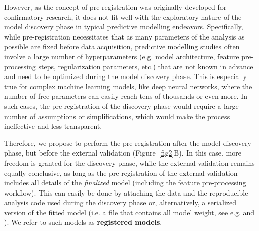 \documentclass{article}
\begin{document}
However, as the concept of pre-registration was originally developed for confirmatory research, it does not fit well with the exploratory nature of the model discovery phase in typical predictive modelling endeavors. Specifically, while pre-registration necessitates that as many parameters of the analysis as possible are fixed before data acquisition, predictive modelling studies often involve a large number of hyperparameters (e.g. model architecture, feature pre-processing steps, regularization parameters, etc.) that are not known in advance and need to be optimized during the model discovery phase. This is especially true for complex machine learning models, like deep neural networks, where the number of free parameters can easily reach tens of thousands or even more. In such cases, the pre-registration of the discovery phase would require a large number of assumptions or simplifications, which would make the process ineffective and less transparent.

Therefore, we propose to perform the pre-registration after the model discovery phase, but before the external validation (Figure~\ref{fig2}B). In this case, more freedom is granted for the discovery phase, while the external validation remains equally conclusive, as long as the pre-registration of the external validation includes all details of the \textit{finalized} model (including the feature pre-processing workflow). This can easily be done by attaching the data and the reproducible analysis code used during the discovery phase or, alternatively, a serialized version of the fitted model (i.e. a file that contains all model weight, see e.g. \cite{Spisak_2020} and \cite{Kincses_2023}). We refer to such models as \textbf{registered models}.
\end{document}
